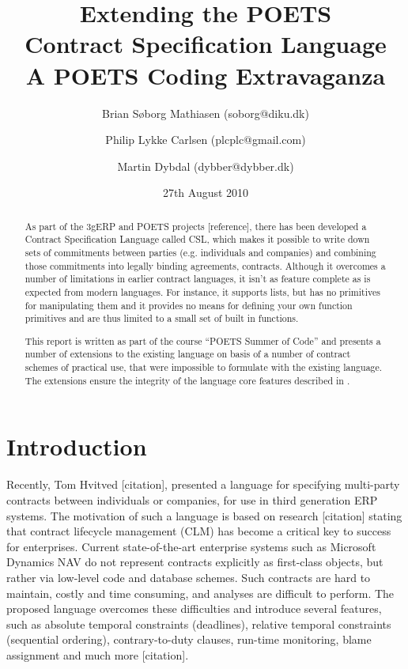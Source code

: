 \documentclass[10pt,a4paper,final,oneside,openany,article]{memoir}
\title{Extending the POETS \\ Contract Specification Language\\
       \vspace{0.1cm}
        \small{A POETS Coding Extravaganza}}
\author{Brian Søborg Mathiasen (soborg@diku.dk) \and
        Philip Lykke Carlsen (plcplc@gmail.com) \and
        Martin Dybdal (dybber@dybber.dk)}
\date{27th August 2010}
\begin{document}
\maketitle

\begin{abstract}
  As part of the 3gERP and POETS projects [reference], there has been
  developed a Contract Specification Language called CSL, which makes
  it possible to write down sets of commitments between parties
  (e.g. individuals and companies) and combining those commitments
  into legally binding agreements, contracts. Although it overcomes a
  number of limitations in earlier contract languages, it isn't as
  feature complete as is expected from modern languages. For instance,
  it supports lists, but has no primitives for manipulating them and
  it provides no means for defining your own function primitives and
  are thus limited to a small set of built in functions.

  This report is written as part of the course "`POETS Summer of
  Code"' and presents a number of extensions to the existing language
  on basis of a number of contract schemes of practical use, that were
  impossible to formulate with the existing language. The extensions
  ensure the integrity of the language core features described in
  \cite{hvitved10}.
\end{abstract}

\listoffixmes


\newpage
\chapter{Introduction}
Recently, Tom Hvitved [citation], presented a language for specifying
multi-party contracts between individuals or companies, for use in third
generation ERP systems. The motivation of such a language is based on research
[citation] stating that contract lifecycle management (CLM) has become a
critical key to success for enterprises. Current state-of-the-art enterprise
systems such as Microsoft Dynamics NAV do not represent contracts explicitly as
first-class objects, but rather via low-level code and database schemes. Such
contracts are hard to maintain, costly and time consuming, and analyses are
difficult to perform. The proposed language overcomes these difficulties and
introduce several features, such as absolute temporal constraints (deadlines),
relative temporal constraints (sequential ordering), contrary-to-duty clauses,
run-time monitoring, blame assignment and much more [citation].
\end{document}
